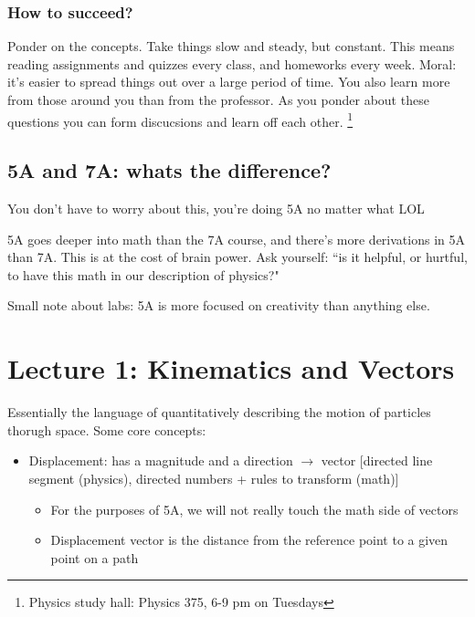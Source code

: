 \documentclass{article}
\theoremstyle{definition}
\numberwithin{equation}{section}
\numberwithin{definition}{section}
\begin{document}
	\medskip
	
	\subsubsection{How to succeed?}
	
	Ponder on the concepts. Take things slow and steady, but constant. This means reading assignments and quizzes every class, and homeworks every week. Moral: it's easier to spread things out over a large period of time. You also learn more from those around you than from the professor. As you ponder about these questions you can form discucsions and learn off each other. \footnote{Physics study hall: Physics 375, 6-9 pm on Tuesdays}
	
	
	\medskip
	
	\subsection{5A and 7A: whats the difference?}
	
	\small{You don't have to worry about this, you're doing 5A no matter what LOL}
	
	\medskip
	
	5A goes deeper into math than the 7A course, and there's more derivations in 5A than 7A. This is at the cost of brain power. Ask yourself: ``is it helpful, or hurtful, to have this math in our description of physics?"
	
	\medskip
	
	Small note about labs: 5A is more focused on creativity than anything else. 
	
	
	\section{Lecture 1: Kinematics and Vectors}
	
	Essentially the language of quantitatively describing the motion of particles thorugh space. Some core concepts:
	
	\begin{itemize}
		\item Displacement: has a magnitude and a direction $\rightarrow$ vector [directed line segment (physics), directed numbers + rules to transform (math)]
		\begin{itemize}
			\item For the purposes of 5A, we will not really touch the math side of vectors
			\item Displacement vector is the distance from the reference point to a given point on a path
		\end{itemize}
	\end{itemize}
\end{document}
